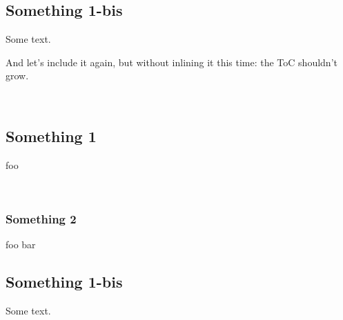 \subsection{Something 1-bis\label{something-1-bis_4}}%
Some text.

And let's include it again, but without inlining it this time: the ToC shouldn't grow.

 \hyperref[Include_sections-module-type-Something]{}\label{Include_sections-val-something}\\
\subsection{Something 1\label{something-1_5}}%
foo

\label{Include_sections-val-foo}\\
\subsubsection{Something 2\label{something-2_5}}%
\label{Include_sections-val-bar}\begin{ocamlindent}foo bar\end{ocamlindent}%
\medbreak
\subsection{Something 1-bis\label{something-1-bis_5}}%
Some text.



